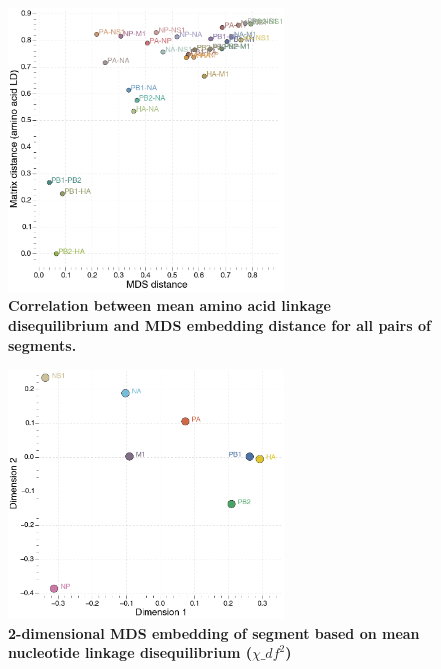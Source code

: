\documentclass[11pt,oneside,letterpaper]{article}
\begin{document}
\begin{figure}
\centering  
\includegraphics[width=0.65\textwidth]  {supp_figures/InfB_aaLD_MatrixMDScorr.png}
\caption{\textbf{Correlation between mean amino acid linkage disequilibrium and MDS embedding distance for all pairs of segments.}}
\label{}
\end{figure}

\begin{figure}
\centering  
\includegraphics[width=0.65\textwidth]  {supp_figures/InfB_8x8_ntLD_MDS.png}
\caption{\textbf{2-dimensional MDS embedding of segment based on mean nucleotide linkage disequilibrium ($\chi\_{df}^{2}$)}}
\label{}
\end{figure}
\end{document}
